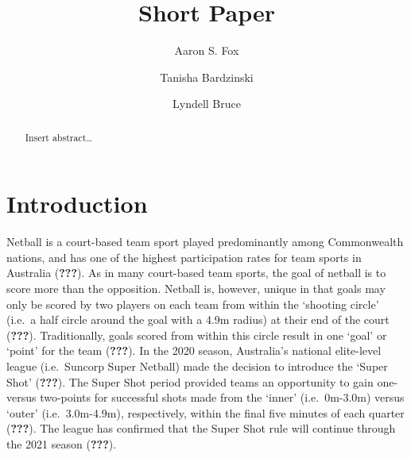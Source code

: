 \documentclass[]{elsarticle} %
\begin{document}
\begin{frontmatter}

  \title{Short Paper}
    \author[Centre for Sport Research]{Aaron S. Fox}
  
    \author[Centre for Sport Research]{Tanisha Bardzinski}
  
    \author[Centre for Sport Research]{Lyndell Bruce}
  
      \address[Centre for Sport Research]{Centre for Sport Research,
School of Exercise and Nutrition Sciences, Deakin University, Geelong,
Australia}
  
  \begin{abstract}
  Insert abstract\ldots{}
  \end{abstract}
  
 \end{frontmatter}

\hypertarget{introduction}{%
\section{Introduction}\label{introduction}}

Netball is a court-based team sport played predominantly among
Commonwealth nations, and has one of the highest participation rates for
team sports in Australia ({\textbf{???}}). As in many court-based team
sports, the goal of netball is to score more than the opposition.
Netball is, however, unique in that goals may only be scored by two
players on each team from within the `shooting circle' (i.e.~a half
circle around the goal with a 4.9m radius) at their end of the court
({\textbf{???}}). Traditionally, goals scored from within this circle
result in one `goal' or `point' for the team ({\textbf{???}}). In the
2020 season, Australia's national elite-level league (i.e.~Suncorp Super
Netball) made the decision to introduce the `Super Shot'
({\textbf{???}}). The Super Shot period provided teams an opportunity to
gain one- versus two-points for successful shots made from the `inner'
(i.e.~0m-3.0m) versus `outer' (i.e.~3.0m-4.9m), respectively, within the
final five minutes of each quarter ({\textbf{???}}). The league has
confirmed that the Super Shot rule will continue through the 2021 season
({\textbf{???}}).
\end{document}
